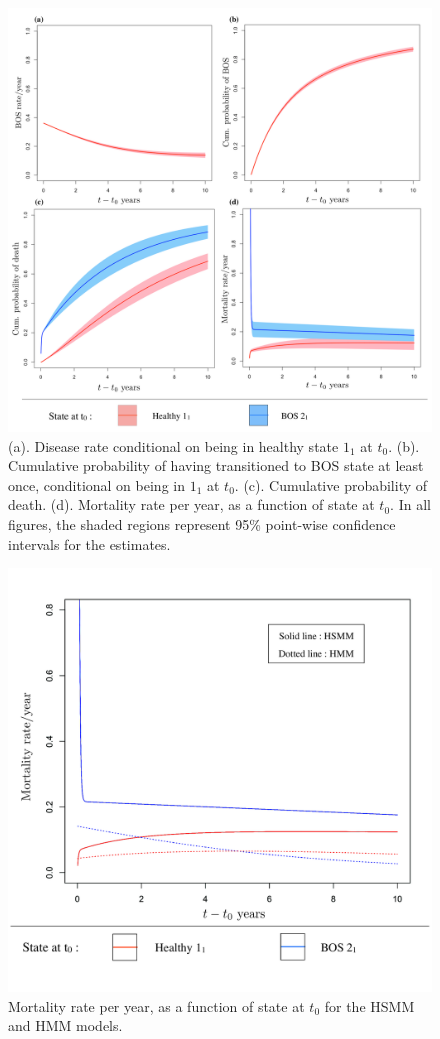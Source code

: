 \documentclass{uwstat572}
\begin{document}
\begin{figure}[t]
\centering
\includegraphics[scale=0.4]{4plots4.pdf}
\caption{(a). Disease rate conditional on being in healthy state $1_1$ at $t_0$. (b). Cumulative probability of having transitioned to BOS state at least once, conditional on being in $1_1$ at $t_0$. (c). Cumulative probability of death. (d). Mortality rate per year, as a function of state at $t_0$. In all figures, the shaded regions represent 95\% point-wise confidence intervals for the estimates.
}
\end{figure}
\begin{figure}[t]
\centering
\includegraphics[scale=0.4]{mortcomp_hsmmhmmkey.pdf}
\caption{Mortality rate per year, as a function of state at $t_0$ for the HSMM and HMM models.}
\end{figure}
\end{document}
